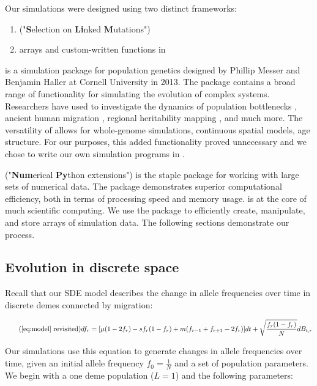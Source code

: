 Our simulations were designed using two distinct frameworks: 

\begin{enumerate}
    \item {} ("\textbf{S}election on \textbf{Li}nked \textbf{M}utations")
    \item {} arrays and custom-written functions in 
\end{enumerate}

 is a simulation package for population genetics designed by Phillip Messer and Benjamin Haller at Cornell University in 2013.\cite{haller_slim_2019} The package contains a broad range of functionality for simulating the evolution of complex systems. Researchers have used  to investigate the dynamics of population bottlenecks \cite{pedersen_effect_2017}, ancient human migration \cite{sikora_ancient_2017}, regional heritability mapping \cite{caballero_nature_2015}, and much more. The versatility of  allows for whole-genome simulations, continuous spatial models, age structure. For our purposes, this added functionality proved unnecessary and we chose to write our own simulation programs in .  

 ("\textbf{Num}erical \textbf{Py}thon extensions") is the staple  package for working with large sets of numerical data. The package demonstrates superior computational efficiency, both in terms of processing speed and memory usage.  is at the core of much scientific computing.\cite{van_der_walt_numpy_2011} We use the package to efficiently create, manipulate, and store arrays of simulation data. The following sections demonstrate our process. 


\subsection{Evolution in discrete space}

Recall that our SDE model describes the change in allele frequencies over time in discrete demes connected by migration:

\begin{equation}
    \tag{\ref{eq:model} revisited}
    df_r=[\mu(1-2f_r)-sf_r (1-f_r ) + m (f_{r-1}+f_{r+1}-2f_r)]dt+\sqrt{\frac{f_r (1-f_r )}{N}} dB_{t,r}
\end{equation}

Our simulations use this equation to generate changes in allele frequencies over time, given an initial allele frequency $f_0 = \frac{1}{N}$ and a set of population parameters. We begin with a one deme population ($L = 1$) and the following parameters:

